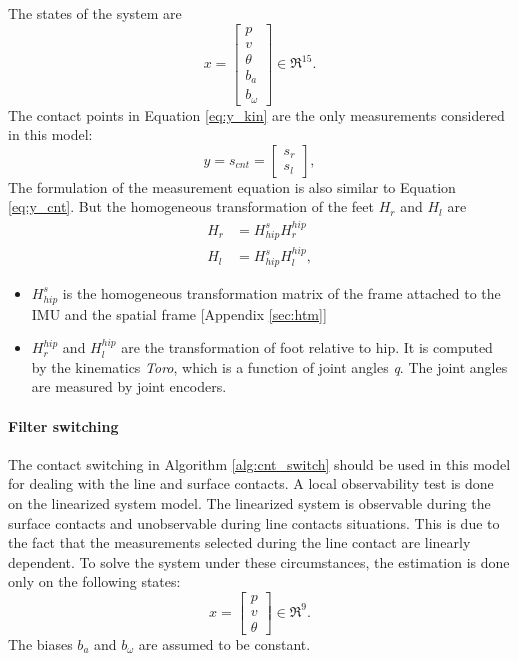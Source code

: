 The states of the system are
\begin{equation}
x = \begin{bmatrix} p \\ v \\ \theta \\ b_a \\ b_{\omega} \end{bmatrix} \in \Re^{15}.
\end{equation}
The contact points in Equation \ref{eq:y_kin} are the only measurements considered in this model:
\begin{equation}
    \label{eq:y_simp}
    y = s_{cnt} = \begin{bmatrix}s_{r}\\ s_{l}\end{bmatrix},
\end{equation}
The formulation of the measurement equation is also similar to Equation \ref{eq:y_cnt}. But the homogeneous transformation of the feet $H_r$ and $H_l$ are 
$$\begin{aligned}
H_r &= H_{hip}^{s}H^{hip}_{r} \\
H_l &= H_{hip}^{s}H^{hip}_{l},
\end{aligned}$$
\begin{itemize}
    \item $H_{hip}^{s}$ is the homogeneous transformation matrix of the frame attached to the IMU and the spatial frame [Appendix \ref{sec:htm}]
    \item $H^{hip}_r$ and $H^{hip}_l$ are the transformation of foot relative to hip. It is computed by the kinematics \emph{Toro}, which is a function of joint angles \emph{q}. The joint angles are measured by joint encoders.
\end{itemize}

\paragraph{Filter switching} The contact switching in Algorithm \ref{alg:cnt_switch} should be used in this model for dealing with the line and surface contacts. A local observability test is done on the linearized system model. The linearized system is observable during the surface contacts and unobservable during line contacts situations. %
This is due to the fact that the measurements selected during the line contact are linearly dependent. To solve the system under these circumstances, the estimation is done only on the following states:
\begin{equation}
\label{eq:dyn_imu_red}
x=\begin{bmatrix}
p \\ v\\ \theta
\end{bmatrix} \in \Re^9.
\end{equation} The biases $b_a$ and $b_\omega$ are assumed to be constant. 

